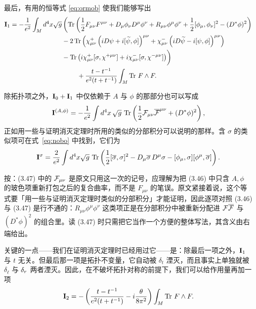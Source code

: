 最后，有用的恒等式 \eqref{eq:ormob} 使我们能够写出
\setcounter{equation}{45}
\begin{equation}\label{eq:nuseful}
\begin{aligned}{{{\mathbf{I}}}}_1=-{1\over e^2}\int_Md^4x \sqrt
g&\left(\operatorname{Tr}\left({1\over 2}F_{\mu\nu} F^{\mu\nu}+D_\mu\phi_\nu
D^\mu\phi^\nu +R_{\mu\nu}\phi^\mu\phi^\nu+ {1\over
2}[\phi_\mu,\phi_\nu]^2-(D^*\phi)^2
  \right)\right.\\ &-
2\operatorname{Tr}\left(\chi^+_{\mu\nu}\left(iD\psi+i[\widetilde\psi,\phi]\right)^{\mu\nu}
+\chi^-_{\mu\nu}\left(iD\widetilde\psi-i[\psi,\phi]\right)^{\mu\nu}\right)\\
&-\operatorname{Tr}\left(i\chi^+_{\mu\nu}[\sigma,\chi^{+\mu\nu}]+
i\chi^-_{\mu\nu}[\sigma,\chi^{-\mu\nu}] \right)\biggr)\\ &
~~~~~~~+{t-t^{-1}\over e^2(t+t^{-1})}\int_M\operatorname{Tr}\, F\wedge F.\\\end{aligned}
\end{equation}

除拓扑项之外，${{{\mathbf{I}}}}_0+{{{\mathbf{I}}}}_1$ 中仅依赖于 $A$ 与 $\phi$ 的那部分也可以写成 \cite{ref53}%
\setcounter{equation}{46}
\begin{equation}\label{eq:wingo}
{{{\mathbf{I}}}}^{(A,\phi)}=-{1\over
e^2}\int d^4x\,\sqrt g\, \operatorname{Tr}\left({1\over 2}
{\mathcal{F}}_{\mu\nu}\overline{{\mathcal{F}}}^{\mu\nu}+(D^*\phi)^2\right),
\end{equation}
正如用一些与证明消灭定理时所用的类似的分部积分可以说明的那样。含 $\sigma$ 的类似项可在式~\eqref{eq:nobo} 中找到，它们为%
\setcounter{equation}{47}
\begin{equation}\label{eq:uwingo}
{{\mathbf{I}}}^\sigma={2\over e^2}\int d^4x \sqrt g\,\operatorname{Tr}\left( {1\over
2}[\overline\sigma,\sigma]^2- D_\mu\overline\sigma\,D^\mu\sigma
-[\phi_\mu,\sigma][\phi^\mu,\overline\sigma]\right).
\end{equation}

\begin{yizhu}[含糊点拨]
按：(3.47) 中的 ${\mathcal{F}}_{\mu\nu}$ 是原文只用这一次的记号，应理解为把 (3.46) 中只含 $A,\phi$ 的玻色项重新打包之后的复合曲率，而不是 $F_{\mu\nu}$ 的笔误。原文紧接着说，这个等式要「用一些与证明消灭定理时类似的分部积分」才能证明，因此逐项对照 (3.46) 与 (3.47) 是行不通的：$R_{\mu\nu}\phi^\mu\phi^\nu$ 这类项正是在分部积分中被重新分配进 ${\mathcal{F}}\overline{{\mathcal{F}}}$ 与 $(D^*\phi)^2$ 的组合里。读 (3.47) 时只需把它当作一个方便的整体写法，其含义由右端给出。
\end{yizhu}

关键的一点——我们在证明消灭定理时已经用过它——是：除最后一项之外，${{{\mathbf{I}}}}_1$ 与 $t$ 无关。但最后那一项是拓扑不变量，它自动被 $\delta_t$ 湮灭，而且事实上单独就被 $\delta_\ell$ 与 $\delta_r$ 两者湮灭。因此，在不破坏拓扑对称的前提下，我们可以给作用量再加一项%
\setcounter{equation}{48}
\begin{equation}\label{eq:ucno}
{{{\mathbf{I}}}}_2=-\left({t-t^{-1}\over
e^2(t+t^{-1})}-i{\theta\over 8\pi^2}\right)\int_M\operatorname{Tr}\,F\wedge F.
\end{equation}

